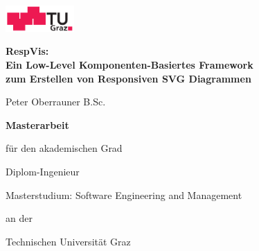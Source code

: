 \begin{otherlanguage}{austrian}

    \vspace*{-3cm}

    \begin{center}
        \includegraphics[height=1cm]{diagrams/tugraz-logo.pdf}

        \vspace{2cm}

        \begin{spacing}{1.1}
            \huge\sffamily\bfseries
            RespVis:\\
            Ein Low-Level Komponenten-Basiertes Framework\\
            zum Erstellen von Responsiven SVG Diagrammen
        \end{spacing}

        \vspace{2cm}

        {\Large\sffamily Peter Oberrauner B.Sc.}

        \vspace{2cm}

        {\Large\sffamily\bfseries Masterarbeit}

        \vspace{5mm}

        {\small\sffamily für den akademischen Grad}

        \vspace{5mm}

        {\normalsize\sffamily Diplom-Ingenieur}

        \vspace{5mm}

        {\normalsize\sffamily
            Masterstudium: Software Engineering and Management
        }


        \vspace{1cm}

        {\small\sffamily an der}

        \vspace{5mm}

        {\large\sffamily Technischen Universität Graz}



        \vspace{1cm}


\end{center}
\end{otherlanguage}
